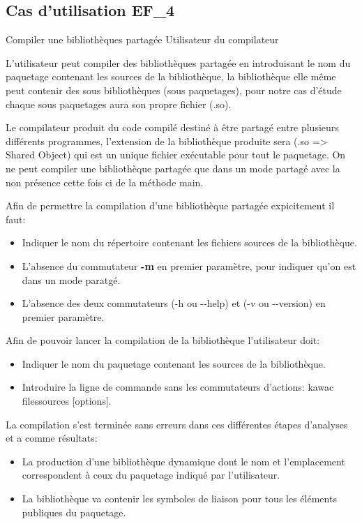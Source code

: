\subsection{Cas d'utilisation EF\_4}
\fiche
{Compiler une bibliothèques partagée}                      %
{Utilisateur du compilateur}                               %
{                                                %
    L'utilisateur peut compiler des bibliothèques partagée en introduisant le nom du paquetage contenant les sources de la bibliothèque, la bibliothèque elle même peut contenir des sous bibliothèques (sous paquetages), pour notre cas d'étude chaque sous paquetages aura son propre fichier (.so).

     Le compilateur produit du code compilé destiné à être partagé entre plusieurs différents programmes, l'extension de la bibliothèque produite sera (.so => Shared Object) qui est un unique fichier exécutable pour tout le paquetage. On ne peut compiler une bibliothèque partagée que dans un mode partagé avec la non présence cette fois ci de la méthode main.      
}
{
	Afin de permettre la compilation d'une bibliothèque partagée expicitement il faut:
	\begin{itemize}
  	\item Indiquer le nom du répertoire contenant les fichiers sources de la bibliothèque.
  	\item L'absence du commutateur \textbf {-m} en premier paramètre, pour indiquer qu'on est dans un mode paratgé.
  	\item L'absence des deux commutateurs (-h ou -\hspace{0.1mm}-help) et (-v ou -\hspace{0.1mm}-version) en premier paramètre.
  	\end {itemize}
}               %
{
	Afin de pouvoir lancer la compilation de la bibliothèque l'utilisateur doit:
	\begin{itemize}
  	\item Indiquer le nom du paquetage contenant les sources de la bibliothèque.
  	\item Introduire la ligne de commande sans les commutateurs d'actions: kawac filessources [options].
  	\end {itemize}

} %
{{                                                %
  
}{}
La compilation s'est terminée sans erreurs dans ces différentes étapes d'analyses et a comme résultats:
	\begin{itemize}
  	\item La production d'une bibliothèque dynamique dont le nom et l'emplacement correspondent à ceux du paquetage indiqué par l'utilisateur.
  	\item La bibliothèque va contenir les symboles de liaison pour tous les éléments publiques du paquetage.
  	\end {itemize}

} %

